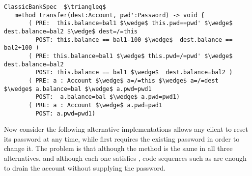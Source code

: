 \begin{lstlisting}[mathescape=true, frame=lines, language=Chainmail]
ClassicBankSpec  $\triangleq$
   method transfer(dest:Account, pwd':Password) -> void {
       ( PRE:  this.balance=bal1 $\wedge$ this.pwd==pwd' $\wedge$ dest.balance=bal2 $\wedge$ dest=/=this 
         POST: this.balance == bal1-100 $\wedge$  dest.balance == bal2+100 )
       ( PRE: this.balance=bal1 $\wedge$ this.pwd=/=pwd' $\wedge$ dest.balance=bal2
         POST: this.balance == bal1 $\wedge$  dest.balance=bal2 )
       ( PRE: a : Account $\wedge$ a=/=this $\wedge$ a=/=dest  $\wedge$ a.balance=bal $\wedge$ a.pwd=pwd1
         POST:  a.balance=bal $\wedge$ a.pwd=pwd1)
       ( PRE: a : Account $\wedge$ a.pwd=pwd1  
         POST: a.pwd=pwd1)       
\end{lstlisting}
 
 

Now consider the following alternative implementations\jm[]{:}
 allows any client to reset its password at any time, while
 first requires the existing password in order to change it.
The problem is that although the  method is the same in
all three alternatives, and although each one satisfies ,
 code sequences such as
%
%
are enough to drain the account   without supplying the password.


  
%
  
